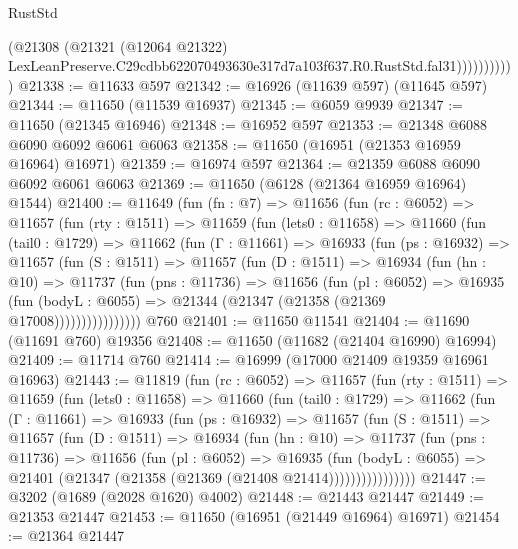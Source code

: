 \begin{lexlean}{RustStd}
\begin{coremodule}
                      (@21308
                        (@21321
                          (@12064 @21322)
                          LexLeanPreserve.C29cdbb622070493630e317d7a103f637.R0.RustStd.fal31)))))))))))
@21338 := @11633 @597
@21342 := @16926 (@11639 @597) (@11645 @597)
@21344 := @11650 (@11539 @16937)
@21345 := @6059 @9939
@21347 := @11650 (@21345 @16946)
@21348 := @16952 @597
@21353 := @21348 @6088 @6090 @6092 @6061 @6063
@21358 := @11650 (@16951 (@21353 @16959 @16964) @16971)
@21359 := @16974 @597
@21364 := @21359 @6088 @6090 @6092 @6061 @6063
@21369 := @11650 (@6128 (@21364 @16959 @16964) @1544)
@21400 := @11649
    (fun (fn : @7) =>
    @11656
      (fun (rc : @6052) =>
      @11657
        (fun (rty : @1511) =>
        @11659
          (fun (lets0 : @11658) =>
          @11660
            (fun (tail0 : @1729) =>
            @11662
              (fun (Γ : @11661) =>
              @16933
                (fun (ps : @16932) =>
                @11657
                  (fun (S : @1511) =>
                  @11657
                    (fun (D : @1511) =>
                    @16934
                      (fun (hn : @10) =>
                      @11737
                        (fun (pns : @11736) =>
                        @11656
                          (fun (pl : @6052) =>
                          @16935
                            (fun (bodyL : @6055) =>
                            @21344 (@21347 (@21358 (@21369 @17008))))))))))))))))
    @760
@21401 := @11650 @11541
@21404 := @11690 (@11691 @760) @19356
@21408 := @11650 (@11682 (@21404 @16990) @16994)
@21409 := @11714 @760
@21414 := @16999 (@17000 @21409 @19359 @16961 @16963)
@21443 := @11819
    (fun (rc : @6052) =>
    @11657
      (fun (rty : @1511) =>
      @11659
        (fun (lets0 : @11658) =>
        @11660
          (fun (tail0 : @1729) =>
          @11662
            (fun (Γ : @11661) =>
            @16933
              (fun (ps : @16932) =>
              @11657
                (fun (S : @1511) =>
                @11657
                  (fun (D : @1511) =>
                  @16934
                    (fun (hn : @10) =>
                    @11737
                      (fun (pns : @11736) =>
                      @11656
                        (fun (pl : @6052) =>
                        @16935
                          (fun (bodyL : @6055) =>
                          @21401 (@21347 (@21358 (@21369 (@21408 @21414))))))))))))))))
@21447 := @3202 (@1689 (@2028 @1620) @4002)
@21448 := @21443 @21447
@21449 := @21353 @21447
@21453 := @11650 (@16951 (@21449 @16964) @16971)
@21454 := @21364 @21447

\end{coremodule}
\end{lexlean}
